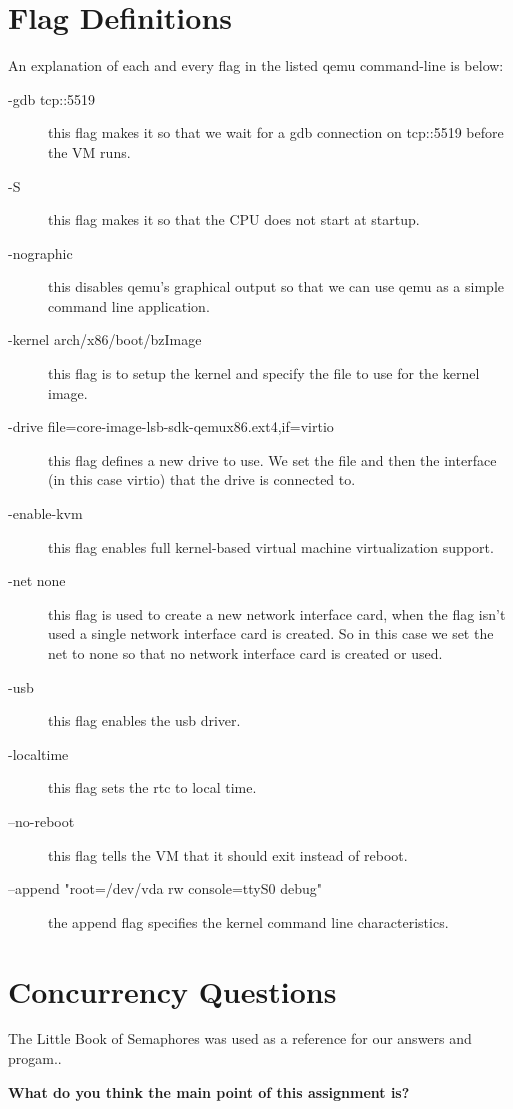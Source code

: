 \documentclass[10pt,letterpaper,draftclsnofoot,onecolumn]{IEEEtran}
\begin{document}
\section{Flag Definitions}
\noindent An explanation of each and every flag in the listed qemu command-line is below:
\begin{description}
\item [-gdb tcp::5519] this flag makes it so that we wait for a gdb connection on tcp::5519 before the VM runs.
\item [-S] this flag makes it so that the CPU does not start at startup.
\item [-nographic] this disables qemu's graphical output so that we can use qemu as a simple command line application.
\item [-kernel arch/x86/boot/bzImage] this flag is to setup the kernel and specify the file to use for the kernel image.
\item [-drive file=core-image-lsb-sdk-qemux86.ext4,if=virtio] this flag defines a new drive to use. We set the file and then the interface (in this case virtio) that the drive is connected to.
\item [-enable-kvm] this flag enables full kernel-based virtual machine virtualization support.
\item [-net none] this flag is used to create a new network interface card, when the flag isn’t used a single network interface card is created. So in this case we set the net to none so that no network interface card is created or used.
\item [-usb] this flag enables the usb driver.
\item [-localtime] this flag sets the rtc to local time.
\item [--no-reboot] this flag tells the VM that it should exit instead of reboot.
\item [--append "root=/dev/vda rw console=ttyS0 debug"] the append flag specifies the kernel command line characteristics.
\end{description}

\section{Concurrency Questions}
\noindent The Little Book of Semaphores was used as a reference for our answers and progam.\cite{semaphore}.

\noindent\textbf{What do you think the main point of this assignment is?}

\end{document}
